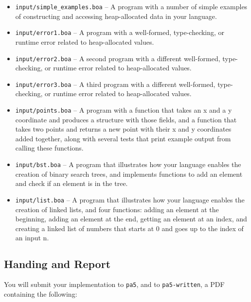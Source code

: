 \documentclass[10pt, oneside]{article}
\begin{document}
\begin{itemize}

\item {\tt input/simple\_examples.boa} -- A program with a number of simple
examples of constructing and accessing heap-allocated data in your language.

\item {\tt input/error1.boa} -- A program with a well-formed, type-checking,
or runtime error related to heap-allocated values.

\item {\tt input/error2.boa} -- A second program with a different
well-formed, type-checking, or runtime error related to heap-allocated
values.

\item {\tt input/error3.boa} -- A third program with a different well-formed,
type-checking, or runtime error related to heap-allocated values.

\item {\tt input/points.boa} -- A program with a function that takes an x and
a y coordinate and produces a structure with those fields, and a function
that takes two points and returns a new point with their x and y coordinates
added together, along with several tests that print example output from
calling these functions.

\item {\tt input/bst.boa} -- A program that illustrates how your language
enables the creation of binary search trees, and implements functions to add
an element and check if an element is in the tree.

\item {\tt input/list.boa} -- A program that illustrates how your language
enables the creation of linked lists, and four functions: adding an element
at the beginning, adding an element at the end, getting an element at an
index, and creating a linked list of numbers that starts at 0 and goes up to
the index of an input n.

\end{itemize}

\subsection*{Handing and Report}

You will submit your implementation to {\tt pa5}, and to {\tt pa5-written}, a
PDF containing the following:
\end{document}
